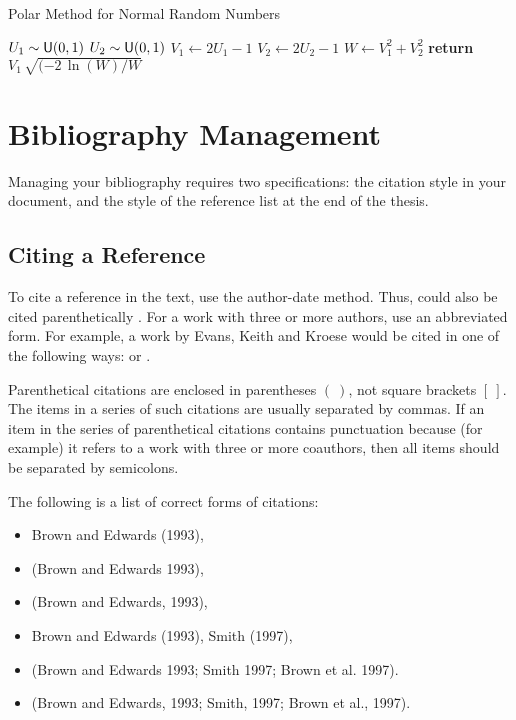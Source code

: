 \documentclass[a4paper,11pt]{article}
\theoremstyle{plain}
\theoremstyle{definition}
\begin{document}
\begin{center}
\begin{minipage}{10cm}
\begin{algorithm}[H]
\caption{Polar Method for Normal Random Numbers}
\begin{algorithmic}[1]
\REPEAT
   \STATE $U_1\sim {\sf U}(0,1)$ 
   \STATE $U_2\sim {\sf U}(0,1)$
   \STATE $V_1 \gets 2U_1 -1$ 
   \STATE $V_2 \gets 2U_2 -1$
   \STATE $W \gets V_1^2 + V_2^2$
\STATE \textbf{return} $V_1\,\sqrt{(-2\,\ln(W)/W}$
\end{algorithmic}
\end{algorithm}
\end{minipage}
\end{center}

\section{Bibliography Management}
Managing your bibliography requires two specifications:
the citation style in your document,
and the style of the reference list at the end of the thesis.

\subsection{Citing a Reference}
To cite a reference in the text, use the author-date method. Thus,
\citet{ross06} could also be cited parenthetically \citep{ross06}.
For a work with three or more authors, use an abbreviated form.
For example, a work by Evans, Keith and Kroese would be cited in
one of the following ways:
\citet{evkekro07} or \citep{evkekro07}.

Parenthetical citations are enclosed in parentheses $(~)$, not square brackets $[~]$.
The items in a series of such citations are usually separated by commas.
If an item in the series of parenthetical citations contains punctuation 
because (for example) it refers to a work with three or more coauthors, 
then all items should be separated by semicolons.

The following is a list of correct forms of citations:
\begin{itemize}
\setlength\itemsep{-1mm}
\item Brown and Edwards (1993),
\item (Brown and Edwards 1993),
\item (Brown and Edwards, 1993),
\item Brown and Edwards (1993), Smith (1997),
\item (Brown and Edwards 1993; Smith 1997; Brown et al. 1997).
\item (Brown and Edwards, 1993; Smith, 1997; Brown et al., 1997).
\end{itemize}
\end{document}
